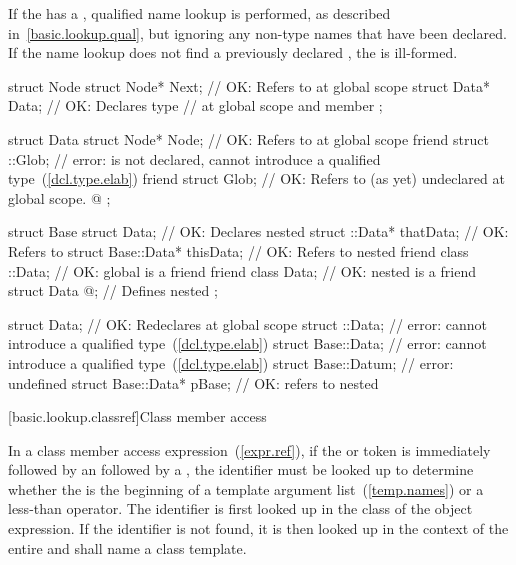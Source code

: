 \pnum
If the  has a
, qualified name lookup is performed, as
described in~\ref{basic.lookup.qual}, but ignoring any non-type names
that have been declared. If the name lookup does not find a previously
declared , the 
is ill-formed. \begin{example}

\begin{codeblock}
struct Node {
  struct Node* Next;            // OK: Refers to  at global scope
  struct Data* Data;            // OK: Declares type 
                                // at global scope and member 
};

struct Data {
  struct Node* Node;            // OK: Refers to  at global scope
  friend struct ::Glob;         // error:  is not declared, cannot introduce a qualified type~(\ref{dcl.type.elab})
  friend struct Glob;           // OK: Refers to (as yet) undeclared  at global scope.
  @\commentellip@
};

struct Base {
  struct Data;                  // OK: Declares nested 
  struct ::Data*     thatData;  // OK: Refers to 
  struct Base::Data* thisData;  // OK: Refers to nested 
  friend class ::Data;          // OK: global  is a friend
  friend class Data;            // OK: nested  is a friend
  struct Data { @\commentellip@ };    // Defines nested 
};

struct Data;                    // OK: Redeclares  at global scope
struct ::Data;                  // error: cannot introduce a qualified type~(\ref{dcl.type.elab})
struct Base::Data;              // error: cannot introduce a qualified type~(\ref{dcl.type.elab})
struct Base::Datum;             // error:  undefined
struct Base::Data* pBase;       // OK: refers to nested 
\end{codeblock}
\end{example} %
%

[basic.lookup.classref]{Class member access}

\pnum
{}%
In a class member access expression~(\ref{expr.ref}), if the 
or \tcode{->} token is immediately followed by an 
followed by a \tcode{<}, the identifier must be looked up to determine
whether the \tcode{<} is the beginning of a template argument
list~(\ref{temp.names}) or a less-than operator. The identifier is first
looked up in the class of the object expression. If the identifier is
not found, it is then looked up in the context of the entire
 and shall name a class template.

